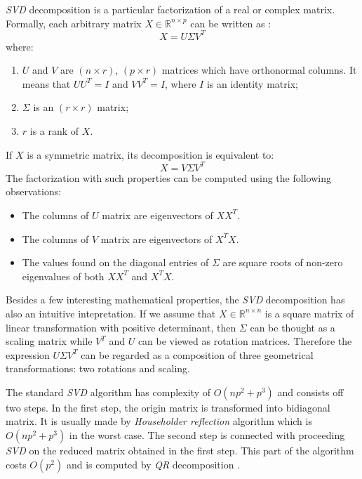 \begin{appendices}
\textit{SVD} decomposition is a particular factorization of a real or complex matrix. Formally, each arbitrary matrix $X \in \mathbb{R}^{n \times p}$ can be written as \cite{Jolliffe}:
\begin{equation}
    X=U\Sigma{V^T}
\end{equation}
where:
\begin{enumerate}
    \item $U$ and $V$ are $(n \times r)$, $(p \times r)$ matrices which have orthonormal columns. It means that $UU^T=I$ and $VV^T=I$, where $I$ is an identity matrix;
    \item $\Sigma$ is an $(r \times r)$ matrix;
    \item $r$ is a rank of $X$.
\end{enumerate}
If $X$ is a symmetric matrix, its decomposition is equivalent to:
\begin{equation}
    X=V\Sigma{V^T}
\end{equation}
The factorization with such properties can be computed using the following observations:
\begin{itemize}
    \item The columns of $U$ matrix are eigenvectors of $XX^T$.
    \item The columns of $V$ matrix are eigenvectors of $X^TX$.
    \item The values found on the diagonal entries of $\Sigma$ are square roots of non-zero eigenvalues of both $XX^T$ and $X^TX$.
\end{itemize}

Besides a few interesting mathematical properties, the \textit{SVD} decomposition has also an intuitive intepretation. If we assume that $X \in \mathbb{R}^{n \times n}$ is a square matrix of linear transformation with positive determinant, then $\Sigma$ can be thought as a scaling matrix while $V^T$ and $U$ can be viewed as rotation matrices. Therefore the expression $U\Sigma{V^T}$ can be regarded as a composition of three geometrical transformations: two rotations and scaling\cite{SVD}.

The standard \textit{SVD} algorithm has complexity of $O(np^2+p^3)$ and consists off two steps. In the first step, the origin matrix is transformed into bidiagonal matrix. It is usually made by \textit{Householder reflection} algorithm which is $O(np^2+p^3)$ in the worst case. The second step is connected with proceeding \textit{SVD} on the reduced matrix obtained in the first step. This part of the algorithm costs $O(p^2)$ and is computed by \textit{QR} decomposition \cite{SVD}. 


\end{appendices}
